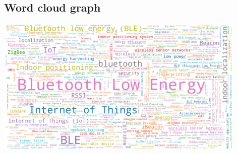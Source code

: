 \documentclass[10pt,letterpaper]{article}
\begin{document}
\subsection{Word cloud graph}

\begin{center}
	\includegraphics[width=0.9\textwidth]{./figures/graph_word_cloud.eps}
\end{center}
\end{document}
